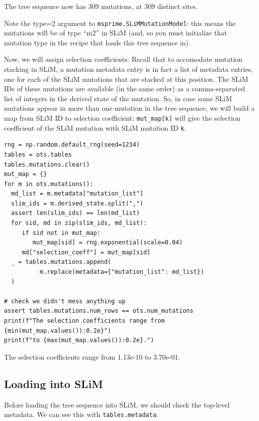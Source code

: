 \documentclass[12pt]{article}
\begin{document}
\begin{pycon}
The tree sequence now has 309 mutations, at 309 distinct sites.
\end{pycon}

Note the type=2 argument to \verb|msprime.SLiMMutationModel|:
this means the mutations will be of type “m2” in SLiM
(and, so you must initialize that mutation type in the recipe that loads this tree sequence in).

Now, we will assign selection coefficients.
Recall that to accomodate mutation stacking in SLiM,
a mutation metadata entry is in fact a list of metadata entries,
one for each of the SLiM mutations that are stacked at this position.
The SLiM IDs of these mutations are available (in the same order) as a comma-separated list of integers in the derived state of the mutation.
So, in case some SLiM mutations appear in more than one mutation in the tree sequence,
we will build a map from SLiM ID to selection coefficient:
\verb|mut_map[k]| will give the selection coefficient of the SLiM mutation with SLiM mutation ID \verb|k|.

\begin{listing}[H]
    \begin{verbatim}
rng = np.random.default_rng(seed=1234)
tables = ots.tables
tables.mutations.clear()
mut_map = {}
for m in ots.mutations():
  md_list = m.metadata["mutation_list"]
  slim_ids = m.derived_state.split(",")
  assert len(slim_ids) == len(md_list)
  for sid, md in zip(slim_ids, md_list):
     if sid not in mut_map:
        mut_map[sid] = rng.exponential(scale=0.04)
     md["selection_coeff"] = mut_map[sid]
  _ = tables.mutations.append(
          m.replace(metadata={"mutation_list": md_list})
  )

# check we didn't mess anything up
assert tables.mutations.num_rows == ots.num_mutations
print(f"The selection coefficients range from {min(mut_map.values()):0.2e}")
print(f"to {max(mut_map.values()):0.2e}.")
  \end{verbatim}
\end{listing}
\begin{pycon}
The selection coefficients range from 1.13e-10 to 3.70e-01.
\end{pycon}

\subsection*{Loading into SLiM}
Before loading the tree sequence into SLiM,
we should check the top-level metadata.
We can see this with \verb|tables.metadata|:
\end{document}

